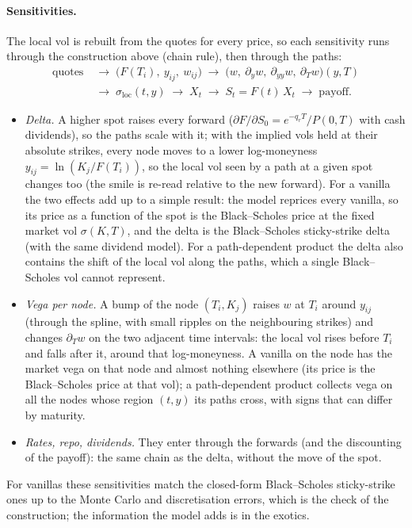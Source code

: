 \paragraph{Sensitivities.} The local vol is rebuilt from the quotes for every price, so each sensitivity runs through
the construction above (chain rule), then through the paths:
\begin{align*}
  \text{quotes} \;&\to\; \big(F(T_i),\ y_{ij},\ w_{ij}\big) \;\to\; \big(w,\ \partial_y w,\ \partial_{yy} w,\ \partial_T w\big)(y, T)\\
  &\to\; \sigma_{\mathrm{loc}}(t, y) \;\to\; X_t \;\to\; S_t = F(t)\,X_t \;\to\; \text{payoff}.
\end{align*}
\begin{itemize}[nosep]
  \item \emph{Delta.} A higher spot raises every forward ($\partial F/\partial S_0 = e^{-q_r T}/P(0,T)$ with cash dividends), so the paths
        scale with it; with the implied vols held at their absolute strikes, every node moves to a lower log-moneyness
        $y_{ij} = \ln(K_j/F(T_i))$, so the local vol seen by a path at a given spot changes too (the smile is re-read relative
        to the new forward). For a vanilla the two effects add up to a simple result: the model reprices every vanilla,
        so its price as a function of the spot is the Black--Scholes price at the fixed market vol $\sigma(K, T)$, and the delta
        is the Black--Scholes sticky-strike delta (with the same dividend model). For a path-dependent product the delta
        also contains the shift of the local vol along the paths, which a single Black--Scholes vol cannot represent.
  \item \emph{Vega per node.} A bump of the node $(T_i, K_j)$ raises $w$ at $T_i$ around $y_{ij}$ (through the spline, with small
        ripples on the neighbouring strikes) and changes $\partial_T w$ on the two adjacent time intervals: the local vol rises
        before $T_i$ and falls after it, around that log-moneyness. A vanilla on the node has the market vega on that node
        and almost nothing elsewhere (its price is the Black--Scholes price at that vol); a path-dependent product
        collects vega on all the nodes whose region $(t, y)$ its paths cross, with signs that can differ by maturity.
  \item \emph{Rates, repo, dividends.} They enter through the forwards (and the discounting of the payoff): the same
        chain as the delta, without the move of the spot.
\end{itemize}
For vanillas these sensitivities match the closed-form Black--Scholes sticky-strike ones up to the Monte Carlo and
discretisation errors, which is the check of the construction; the information the model adds is in the exotics.

